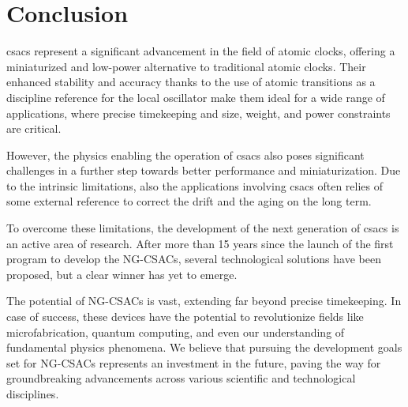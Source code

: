 \section{Conclusion}
\label{sec:conclusion}

\acrfull{csacs} represent a significant advancement in the field of atomic clocks, offering a miniaturized and low-power alternative to traditional atomic clocks.
Their enhanced stability and accuracy thanks to the use of atomic transitions as a discipline reference for the local oscillator make them ideal for a wide range of applications, where precise timekeeping and size, weight, and power constraints are critical.

However, the physics enabling the operation of \acrshort{csacs} also poses significant challenges in a further step towards better performance and miniaturization.
Due to the intrinsic limitations, also the applications involving \acrshort{csacs} often relies of some external reference to correct the drift and the aging on the long term.

To overcome these limitations, the development of the next generation of \acrshort{csacs} is an active area of research.
After more than 15 years since the launch of the first program to develop the NG-CSACs, several technological solutions have been proposed, but a clear winner has yet to emerge.

The potential of NG-CSACs is vast, extending far beyond precise timekeeping.
In case of success, these devices have the potential to revolutionize fields like microfabrication, quantum computing, and even our understanding of fundamental physics phenomena.
We believe that pursuing the development goals set for NG-CSACs represents an investment in the future, paving the way for groundbreaking advancements across various scientific and technological disciplines.